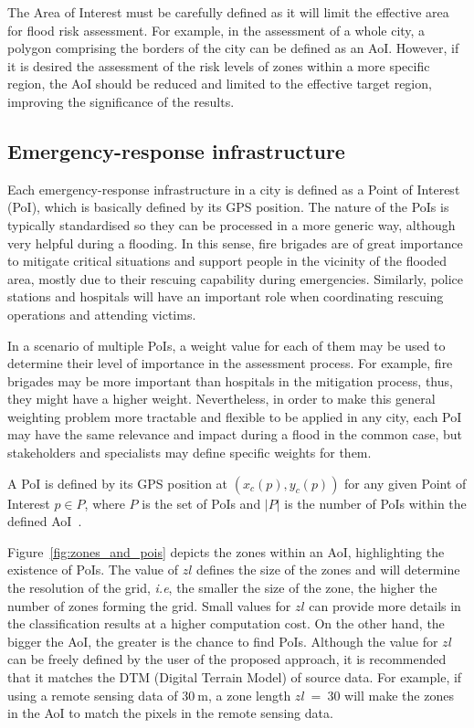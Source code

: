 \begin{refsection}
The Area of Interest must be carefully defined as it will limit the effective area for flood risk assessment. For example, in the assessment of a whole city, a polygon comprising the borders of the city can be defined as an AoI. However, if it is desired the assessment of the risk levels of zones within a more specific region, the AoI should be reduced and limited to the effective target region, improving the significance of the results.

\subsection{Emergency-response infrastructure}

Each emergency-response infrastructure in a city is defined as a Point of Interest (PoI), which is basically defined by its GPS position. The nature of the PoIs is typically standardised so they can be processed in a more generic way, although very helpful during a flooding. In this sense, fire brigades are of great importance to mitigate critical situations and support people in the vicinity of the flooded area, mostly due to their rescuing capability during emergencies. Similarly, police stations and hospitals will have an important role when coordinating rescuing operations and attending victims.

In a scenario of multiple PoIs, a weight value for each of them may be used to determine their level of importance in the assessment process. For example, fire brigades may be more important than hospitals in the mitigation process, thus, they might have a higher weight. Nevertheless, in order to make this general weighting problem more tractable and flexible to be applied in any city, each PoI may have the same relevance and impact during a flood in the common case, but stakeholders and specialists may define specific weights for them.

A PoI is defined by its GPS position at $(x_c(p), y_c(p))$ for any given Point of Interest $p \in P$, where $P$ is the set of PoIs and $|P|$ is the number of PoIs within the defined AoI~\cite{sensorsposition}.

Figure~\ref{fig:zones_and_pois} depicts the zones within an AoI, highlighting the existence of PoIs. The value of $zl$ defines the size of the zones and will determine the resolution of the grid, \textit{i.e}, the smaller the size of the zone, the higher the number of zones forming the grid. Small values for $zl$ can provide more details in the classification results at a higher computation cost. On the other hand, the bigger the AoI, the greater is the chance to find PoIs. Although the value for $zl$ can be freely defined by the user of the proposed approach, it is recommended that it matches the DTM (Digital Terrain Model) of source data. For example, if using a remote sensing data of $30~\mathrm{m}$, a zone length $zl~=~30$ will make the zones in the AoI to match the pixels in the remote sensing data.


\end{refsection}
